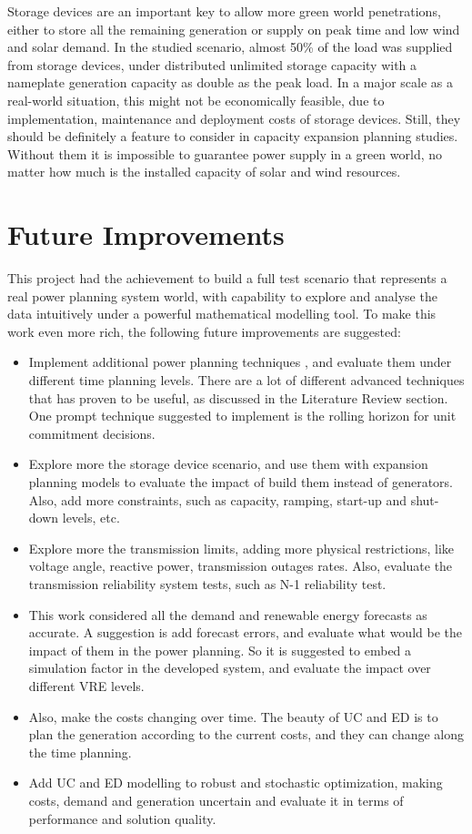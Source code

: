 \documentclass[12pt,LUDisStyle,twosided]{book}
\begin{document}
Storage devices are an important key to allow more green world penetrations, either to store all the remaining generation or supply on peak time and low wind and solar demand. In the studied scenario, almost 50\% of the load was supplied from storage devices, under distributed unlimited storage capacity with a nameplate generation capacity as double as the peak load. In a major scale as a real-world situation, this might not be economically feasible, due to implementation, maintenance and deployment costs of storage devices. Still, they should be definitely a feature to consider in capacity expansion planning studies. Without them it is impossible to guarantee power supply in a green world, no matter how much is the installed capacity of solar and wind resources.

\section{Future Improvements}

This project had the achievement to build a full test scenario that represents a real power planning system world, with capability to explore and analyse the data intuitively under a powerful mathematical modelling tool. To make this work even more rich, the following future improvements are suggested:

\begin{itemize}
\item Implement additional power planning techniques , and evaluate them under different time planning levels. There are a lot of different advanced techniques that has proven to be useful, as discussed in the Literature Review section. One prompt technique suggested to implement is the rolling horizon for unit commitment decisions.
\item Explore more the storage device scenario, and use them with expansion planning models to evaluate the impact of build them instead of generators. Also, add more constraints, such as capacity, ramping, start-up and shut-down levels, etc.
\item Explore more the transmission limits, adding more physical restrictions, like voltage angle, reactive power, transmission outages rates. Also, evaluate the transmission reliability system tests, such as N-1 reliability test.
\item This work considered all the demand and renewable energy forecasts as accurate. A suggestion is add forecast errors, and evaluate what would be the impact of them in the power planning. So it is suggested to embed a simulation factor in the developed system, and evaluate the impact over different VRE levels.
\item Also, make the costs changing over time. The beauty of UC and ED is to plan the generation according to the current costs, and they can change along the time planning.
\item Add UC and ED modelling to robust and stochastic optimization, making costs, demand and generation uncertain and evaluate it in terms of performance and solution quality.

\end{itemize}


\nocite{*}


\end{document}
